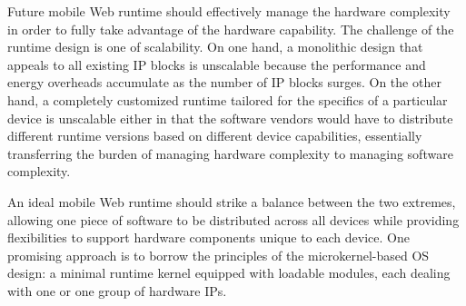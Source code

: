 \begin{itemize}
  Future mobile Web runtime should effectively manage the hardware complexity in order to fully take advantage of the hardware capability. The challenge of the runtime design is one of scalability. On one hand, a monolithic design that appeals to all existing IP blocks is unscalable because the performance and energy overheads accumulate as the number of IP blocks surges. On the other hand, a completely customized runtime tailored for the specifics of a particular device is unscalable either in that the software vendors would have to distribute different runtime versions based on different device capabilities, essentially transferring the burden of managing hardware complexity to managing software complexity.
  
  An ideal mobile Web runtime should strike a balance between the two extremes, allowing one piece of software to be distributed across all devices while providing flexibilities to support hardware components unique to each device. One promising approach is to borrow the principles of the microkernel-based OS design: a minimal runtime kernel equipped with loadable modules, each dealing with one or one group of hardware IPs.
\end{itemize}
















